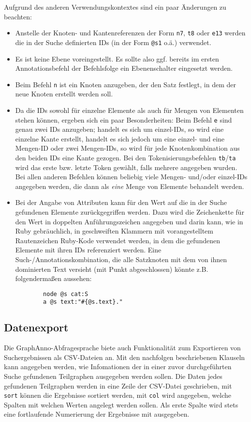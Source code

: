 \documentclass[12pt]{scrartcl}
\begin{document}
Aufgrund des anderen Verwendungskontextes sind ein paar Änderungen zu beachten:
\begin{itemize}
	\item Anstelle der Knoten- und Kantenreferenzen der Form \texttt{n7}, \texttt{t8} oder \texttt{e13} werden die in der Suche definierten IDs (in der Form \texttt{@s1} o.ä.) verwendet.
	\item Es ist keine Ebene voreingestellt. Es sollte also ggf. bereits im ersten Annotationsbefehl der Befehlsfolge ein Ebenenschalter eingesetzt werden.
	\item Beim Befehl \texttt{n} ist ein Knoten anzugeben, der den Satz festlegt, in dem der neue Knoten erstellt werden soll.
	\item Da die IDs sowohl für einzelne Elemente als auch für Mengen von Elementen stehen können, ergeben sich ein paar Besonderheiten: Beim Befehl \texttt{e} sind genau zwei IDs anzugeben; handelt es sich um einzel-IDs, so wird eine einzelne Kante erstellt, handelt es sich jedoch um eine einzel- und eine Mengen-ID oder zwei Mengen-IDs, so wird für jede Knotenkombination aus den beiden IDs eine Kante gezogen. Bei den Tokenisierungsbefehlen \texttt{tb}/\texttt{ta} wird das erste bzw. letzte Token gewählt, falls mehrere angegeben wurden. Bei allen anderen Befehlen können beliebig viele Mengen- und/oder einzel-IDs angegeben werden, die dann als \textit{eine} Menge von Elemente behandelt werden.
	\item Bei der Angabe von Attributen kann für den Wert auf die in der Suche gefundenen Elemente zurückgegriffen werden. Dazu wird die Zeichenkette für den Wert in doppelten Anführungszeichen angegeben und darin kann, wie in Ruby gebräuchlich, in geschweiften Klammern mit vorangestelltem Rautenzeichen Ruby-Kode verwendet werden, in dem die gefundenen Elemente mit ihren IDs referenziert werden. Eine Such-/Annotationskombination, die alle Satzknoten mit dem von ihnen dominierten Text versieht (mit Punkt abgeschlossen) könnte z.B. folgendermaßen aussehen:
	\begin{verbatim}
		node @s cat:S
		a @s text:"#{@s.text}."
	\end{verbatim}
\end{itemize}



\subsection{Datenexport}

Die GraphAnno-Abfragesprache biete auch Funktionalität zum Exportieren von Suchergebnissen als CSV-Dateien an.
Mit den nachfolgen beschriebenen Klauseln kann angegeben werden, wie Infomationen der in einer zuvor durchgeführten Suche gefundenen Teilgraphen ausgegeben werden sollen.
Die Daten jedes gefundenen Teilgraphen werden in eine Zeile der CSV-Datei geschrieben, mit \texttt{sort} können die Ergebnisse sortiert werden, mit \texttt{col} wird angegeben, welche Spalten mit welchen Werten angelegt werden sollen. Als erste Spalte wird stets eine fortlaufende Numerierung der Ergebnisse mit ausgegeben.
\end{document}
